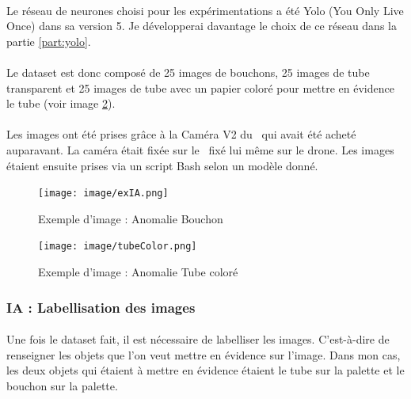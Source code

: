         \paragraph*{}
        Le réseau de neurones choisi pour les expérimentations a été Yolo (You Only Live Once)\cite{yolo} dans sa version 5. Je développerai davantage le choix de ce réseau dans la partie \ref{part:yolo}.
        
        \paragraph*{}
        Le dataset est donc composé de 25 images de bouchons, 25 images de tube transparent et 25 images de tube avec un papier coloré pour mettre en évidence le tube (voir image \ref{fig:tubeColor}).
        
        \paragraph*{}
        Les images ont été prises grâce à la Caméra V2 du \rpi ~qui avait été acheté auparavant. La caméra était fixée sur le \rpi ~fixé lui même sur le drone. Les images étaient ensuite prises via un script Bash selon un modèle donné.
        
        
        \begin{figure}[H]
            \centering
        	\begin{frame}{\texttt{[image: image/exIA.png]}}
        	\end{frame}
        	\caption{\label{fig:exIA}Exemple d'image : Anomalie Bouchon}
        \end{figure}
        
        \begin{figure}[H]
            \centering
        	\begin{frame}{\texttt{[image: image/tubeColor.png]}}
        	\end{frame}
        	\caption{\label{fig:tubeColor}Exemple d'image : Anomalie Tube coloré}
        \end{figure}
        
    \subsubsection{IA : Labellisation des images}
        \paragraph*{}
        Une fois le dataset fait, il est nécessaire de labelliser les images. C'est-à-dire de renseigner les objets que l'on veut mettre en évidence sur l'image. Dans mon cas, les deux objets qui étaient à mettre en évidence étaient le tube sur la palette et le bouchon sur la palette.
        
